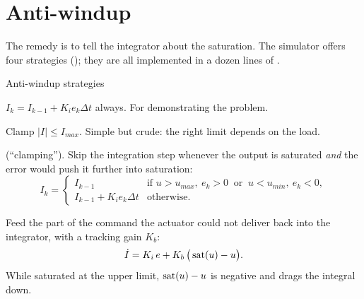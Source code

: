 
\section{Anti-windup}

The remedy is to tell the integrator about the saturation. The simulator offers four strategies (); they are all implemented in a dozen lines of .

\begin{definition}{Anti-windup strategies}
\begin{description}[leftmargin=0pt, itemsep=3pt, font=\sffamily\small\bfseries]
  \item[None.] $I_k = I_{k-1} + K_i e_k \Delta t$ always. For demonstrating the problem.
  \item[Integral limit.] Clamp $|I| \le I_{max}$. Simple but crude: the right limit depends on the load.
  \item[Conditional integration] (\enquote{clamping}). Skip the integration step whenever the output is saturated \emph{and} the error would push it further into saturation:
  \begin{equation*}
    I_k = \begin{cases} I_{k-1} & \text{if } u > u_{max},\ e_k > 0 \ \text{ or }\ u < u_{min},\ e_k<0,\\ I_{k-1} + K_i e_k\Delta t & \text{otherwise.}\end{cases}
  \end{equation*}
  \item[Back-calculation.] Feed the part of the command the actuator could not deliver back into the integrator, with a tracking gain $K_b$:
  \begin{equation}\label{eq:windup-bc}
    \dot I = K_i\,e + K_b\,\big(\operatorname{sat}(u) - u\big).
  \end{equation}
  While saturated at the upper limit, $\operatorname{sat}(u) - u$ is negative and drags the integral down.
\end{description}
\end{definition}

